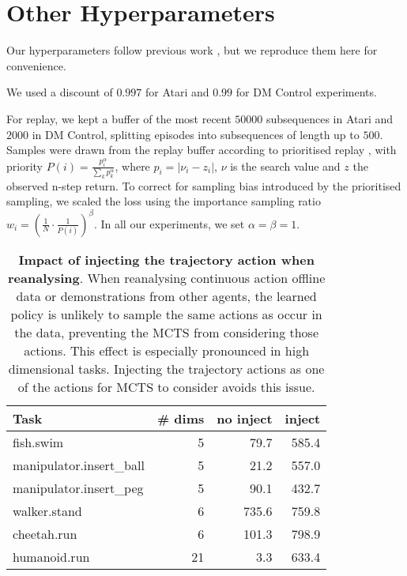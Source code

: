 \documentclass{article}
\begin{document}
\section{Other Hyperparameters}

Our hyperparameters follow previous work \cite{muzero, muzero_sampled}, but we reproduce them here for convenience.

We used a discount of $0.997$ for Atari and $0.99$ for DM Control experiments.

For replay, we kept a buffer of the most recent $50000$ subsequences in Atari and $2000$ in DM Control, splitting episodes into subsequences of length up to $500$. Samples were drawn from the replay buffer according to prioritised replay \cite{Schaul2016}, with priority $P(i) = \frac{p_i^\alpha}{\sum_k{p_k^\alpha}}$, where $p_i = |\nu_i - z_i|$, $\nu$ is the search value and $z$ the observed n-step return. To correct for sampling bias introduced by the prioritised sampling, we scaled the loss using the importance sampling ratio $w_i = (\frac{1}{N} \cdot \frac{1}{P(i)})^\beta$. In all our experiments, we set $\alpha = \beta = 1$.


\begin{table}[h]
\begin{center}\begin{tabularx}{\columnwidth}{lr|rr}
\toprule
Task & \# dims & no inject & inject \\
\midrule
fish.swim & 5  & 79.7 & 585.4 \\
manipulator.insert\_ball & 5  & 21.2 & 557.0 \\
manipulator.insert\_peg & 5  & 90.1 & 432.7 \\
walker.stand & 6  & 735.6 & 759.8 \\
cheetah.run & 6  & 101.3 & 798.9 \\
humanoid.run & 21  & 3.3 & 633.4 \\
\bottomrule
\end{tabularx}
\end{center}
 \caption{
\label{tab:rl-unplugged-mujoco-inject}
\textbf{Impact of injecting the trajectory action when reanalysing}. When reanalysing continuous action offline data or demonstrations from other agents, the learned policy is unlikely to sample the same actions as occur in the data, preventing the MCTS from considering those actions. This effect is especially pronounced in high dimensional tasks. Injecting the trajectory actions as one of the actions for MCTS to consider avoids this issue.
}
\end{table}
\end{document}
